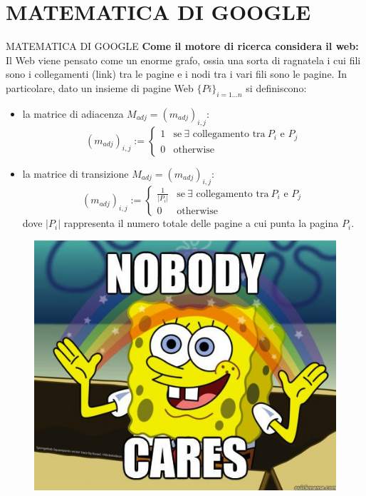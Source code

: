 \documentclass{beamer}
\begin{document}
\section{MATEMATICA DI GOOGLE}
\begin{frame}{MATEMATICA DI GOOGLE}
\textbf{Come il motore di ricerca considera il web:} Il Web viene pensato come un enorme grafo, ossia una sorta di ragnatela i cui fili sono i collegamenti (link) tra le pagine e i nodi tra i vari fili sono le pagine.\newline\newline
In particolare, dato un insieme di pagine Web $\{Pi\}_{i=1…n}$ si definiscono:
\begin{itemize}
\item la matrice di adiacenza $M_{adj} = (m_{adj})_{i,j}$:
\begin{equation*}
    (m_{adj})_{i,j} := 
    \begin{cases}
      1 & \text{se}\ \exists \text{ collegamento tra}\ P_i \text{ e } P_j \\
      0 & \text{otherwise}
    \end{cases}
  \end{equation*}
\item la matrice di transizione $M_{adj} = (m_{adj})_{i,j}$:
\begin{equation*}
    (m_{adj})_{i,j} := 
    \begin{cases}
      \frac{1}{|P_i|} & \text{se}\ \exists \text{ collegamento tra}\ P_i \text{ e } P_j \\
       0 & \text{otherwise}
    \end{cases}
  \end{equation*}
dove $|P_{i}|$ rappresenta il numero totale delle pagine a cui punta la pagina $P_{i}$.
\end{itemize}
\end{frame}
\begin{frame}
\begin{figure}[h!]
\includegraphics[width=0.9\linewidth]{immagini/nobodyCares.jpg}
\end{figure}
\end{frame}
\end{document}
